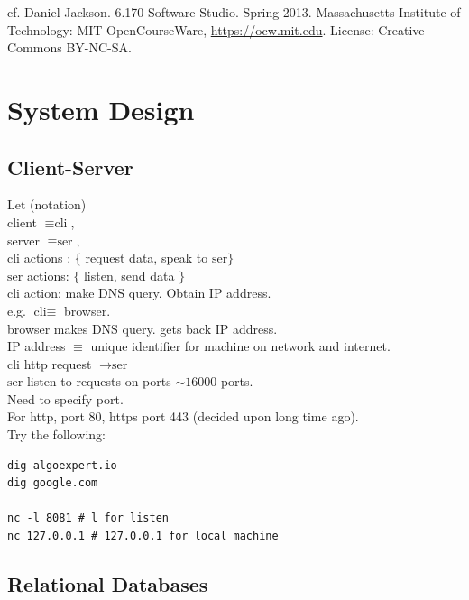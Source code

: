 \documentclass[10pt]{amsart}
\begin{document}
\begin{multicols*}{2}
cf. Daniel Jackson. 6.170 Software Studio. Spring 2013. Massachusetts Institute of Technology: MIT OpenCourseWare, \url{https://ocw.mit.edu}. License: Creative Commons BY-NC-SA. \cite{Jack2013}

\section{System Design}

\subsection{Client-Server}

Let (notation) \\
client $\equiv \text{cli}$, \\
server $\equiv \text{ser}$, \\

$\text{cli}$ actions : $\lbrace $ request data, speak to $\text{ser} \rbrace$  \\
$\text{ser}$ actions: $\lbrace$ listen, send data $\rbrace$ \\

$\text{cli}$ action: make DNS query. Obtain IP address. \\

e.g. $\text{cli} \equiv $ browser. \\
browser makes DNS query. gets back IP address. \\
IP address $\equiv $ unique identifier for machine on network and internet. \\

$\text{cli}$ http request $\to  \text{ser}$ \\

$\text{ser}$ listen to requests on ports $\sim 16000$ ports. \\
Need to specify port. \\
For http, port 80, https port 443 (decided upon long time ago). \\

Try the following:

\begin{lstlisting}
dig algoexpert.io
dig google.com

nc -l 8081 # l for listen
nc 127.0.0.1 # 127.0.0.1 for local machine
\end{lstlisting}

\subsection{Relational Databases}


\end{multicols*}
\end{document}
